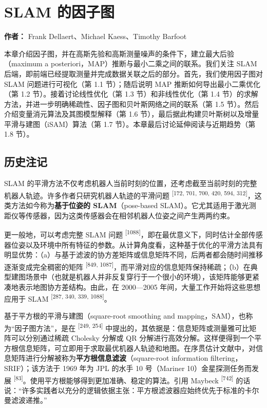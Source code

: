 \chapter{SLAM 的因子图}

\textbf{作者：} Frank Dellaert、Michael Kaess、Timothy Barfoot

本章介绍因子图，并在高斯先验和高斯测量噪声的条件下，建立最大后验（maximum a posteriori，MAP）推断与最小二乘之间的联系。我们关注 SLAM 后端，即前端已经提取测量并完成数据关联之后的部分。首先，我们使用因子图对 SLAM 问题进行可视化（第 1.1 节）；随后说明 MAP 推断如何导出最小二乘优化（第 1.2 节）。接着讨论线性优化（第 1.3 节）和非线性优化（第 1.4 节）的求解方法，并进一步明确稀疏性、因子图和贝叶斯网络之间的联系（第 1.5 节）。然后介绍变量消元算法及其图模型解释（第 1.6 节），最后据此构建贝叶斯树以及增量平滑与建图（iSAM）算法（第 1.7 节）。本章最后讨论延伸阅读与近期趋势（第 1.8 节）。

\section*{历史注记}

SLAM 的平滑方法不仅考虑机器人当前时刻的位置，还考虑截至当前时刻的完整机器人轨迹。许多作者只研究机器人轨迹的平滑问题 \textsuperscript{[172, 701, 700, 420, 594, 312]}，这类方法如今称为\textbf{基于位姿的 SLAM}（pose-based SLAM）。它尤其适用于激光测距仪等传感器，因为这类传感器会在相邻机器人位姿之间产生两两约束。

更一般地，可以考虑完整 SLAM 问题 \textsuperscript{[1088]}，即在最优意义下，同时估计全部传感器位姿以及环境中所有特征的参数。从计算角度看，这种基于优化的平滑方法具有明显优势：（a）与基于滤波的协方差矩阵或信息矩阵不同，后两者都会随时间推移逐渐变成完全稠密的矩阵 \textsuperscript{[849, 1087]}，而平滑对应的信息矩阵保持稀疏；（b）在典型建图场景中（也就是机器人并非反复穿行于一个很小的环境），该矩阵能够更紧凑地表示地图协方差结构。由此，在 2000—2005 年间，大量工作开始将这些思想应用于 SLAM \textsuperscript{[287, 340, 339, 1088]}。

基于平方根的平滑与建图（square-root smoothing and mapping，SAM），也称为“因子图方法”，是在 \textsuperscript{[249, 254]} 中提出的，其依据是：信息矩阵或测量雅可比矩阵可以分别通过稀疏 Cholesky 分解或 QR 分解进行高效分解。这样便得到一个平方根信息矩阵，可立即用于求取最优机器人轨迹和地图。在序贯估计文献中，对信息矩阵进行分解被称为\textbf{平方根信息滤波}（square-root information filtering，SRIF）；该方法于 1969 年为 JPL 的水手 10 号（Mariner 10）金星探测任务而发展 \textsuperscript{[83]}。使用平方根能够得到更加准确、稳定的算法。引用 Maybeck \textsuperscript{[742]} 的话说：“许多实践者以充分的逻辑依据主张：平方根滤波器应始终优先于标准的卡尔曼滤波递推。”

